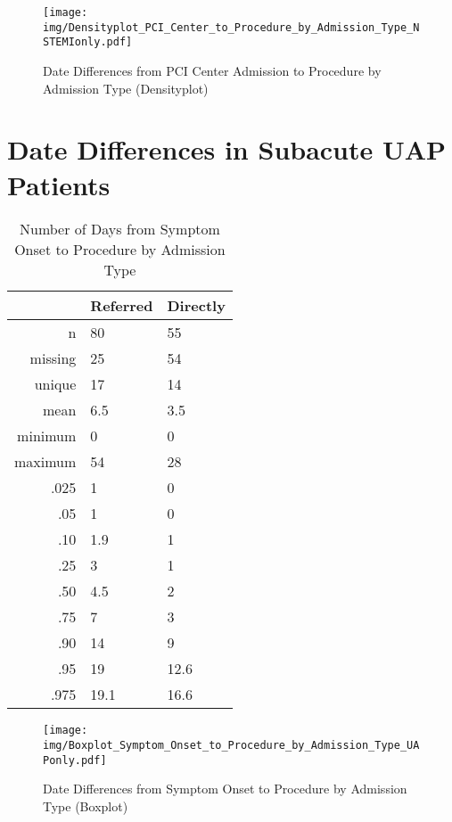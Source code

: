 \documentclass[presentation,xcolor=pdftex,dvipsnames,table,11pt]{beamer}
\begin{document}
\begin{tiny}
\begin{frame}
\begin{figure}
  \centering
  \caption{Date Differences from PCI Center Admission to Procedure by Admission Type (Densityplot)}
  \label{Density: Date Differences from PCI Center Admission to Procedure by Admission Type}
\texttt{[image: img/Densityplot\_PCI\_Center\_to\_Procedure\_by\_Admission\_Type\_NSTEMIonly.pdf]}\end{figure}
\end{frame}








\section{Date Differences in Subacute UAP Patients}

\begin{table}[ht]
\centering
\begin{tabular}{rll}
  \toprule
 & Referred & Directly \\ 
  \midrule
n & 80 & 55 \\ 
  missing & 25 & 54 \\ 
  unique & 17 & 14 \\ 
  mean & 6.5 & 3.5 \\ 
  minimum & 0 & 0 \\ 
  maximum & 54 & 28 \\ 
  .025 & 1 & 0 \\ 
  .05 & 1 & 0 \\ 
  .10 & 1.9 & 1 \\ 
  .25 & 3 & 1 \\ 
  .50 & 4.5 & 2 \\ 
  .75 & 7 & 3 \\ 
  .90 & 14 & 9 \\ 
  .95 & 19 & 12.6 \\ 
  .975 & 19.1 & 16.6 \\ 
   \bottomrule
\end{tabular}
\caption{Number of Days from Symptom Onset to Procedure by Admission Type} 
\end{table}
\begin{frame}
\begin{figure}
  \centering
  \caption{Date Differences from Symptom Onset to Procedure by Admission Type (Boxplot)}
  \label{Boxplot: Date Differences from Symptom Onset to Procedure by Admission Type}
\texttt{[image: img/Boxplot\_Symptom\_Onset\_to\_Procedure\_by\_Admission\_Type\_UAPonly.pdf]}\end{figure}
\end{frame}



\end{tiny}
\end{document}

